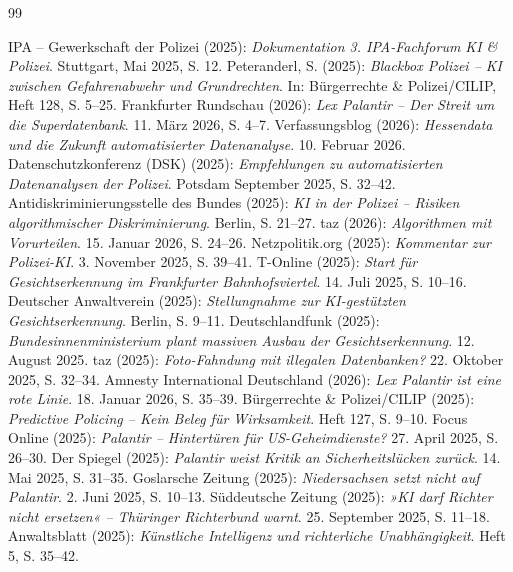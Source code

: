 \documentclass[12pt,a4paper]{article}
\begin{document}
	\newpage
	\begin{thebibliography}{99}
		
		 IPA – Gewerkschaft der Polizei (2025): \emph{Dokumentation 3. IPA-Fachforum KI \& Polizei}. Stuttgart, Mai 2025, S. 12.
		 Peteranderl, S. (2025): \emph{Blackbox Polizei – KI zwischen Gefahrenabwehr und Grundrechten}. In: Bürgerrechte \& Polizei/CILIP, Heft 128, S. 5–25.
		 Frankfurter Rundschau (2026): \emph{Lex Palantir – Der Streit um die Superdatenbank}. 11. März 2026, S. 4–7.
		 Verfassungsblog (2026): \emph{Hessendata und die Zukunft automatisierter Datenanalyse}. 10. Februar 2026.
		 Datenschutzkonferenz (DSK) (2025): \emph{Empfehlungen zu automatisierten Datenanalysen der Polizei}. Potsdam September 2025, S. 32–42.
		 Antidiskriminierungsstelle des Bundes (2025): \emph{KI in der Polizei – Risiken algorithmischer Diskriminierung}. Berlin, S. 21–27.
		 taz (2026): \emph{Algorithmen mit Vorurteilen}. 15. Januar 2026, S. 24–26.
		 Netzpolitik.org (2025): \emph{Kommentar zur Polizei-KI}. 3. November 2025, S. 39–41.
		 T-Online (2025): \emph{Start für Gesichtserkennung im Frankfurter Bahnhofsviertel}. 14. Juli 2025, S. 10–16.
		 Deutscher Anwaltverein (2025): \emph{Stellungnahme zur KI-gestützten Gesichtserkennung}. Berlin, S. 9–11.
		 Deutschlandfunk (2025): \emph{Bundesinnenministerium plant massiven Ausbau der Gesichtserkennung}. 12. August 2025.
		 taz (2025): \emph{Foto-Fahndung mit illegalen Datenbanken?} 22. Oktober 2025, S. 32–34.
		 Amnesty International Deutschland (2026): \emph{Lex Palantir ist eine rote Linie}. 18. Januar 2026, S. 35–39.
		 Bürgerrechte \& Polizei/CILIP (2025): \emph{Predictive Policing – Kein Beleg für Wirksamkeit}. Heft 127, S. 9–10.
		 Focus Online (2025): \emph{Palantir – Hintertüren für US-Geheimdienste?} 27. April 2025, S. 26–30.
		 Der Spiegel (2025): \emph{Palantir weist Kritik an Sicherheitslücken zurück}. 14. Mai 2025, S. 31–35.
		 Goslarsche Zeitung (2025): \emph{Niedersachsen setzt nicht auf Palantir}. 2. Juni 2025, S. 10–13.
		 Süddeutsche Zeitung (2025): \emph{»KI darf Richter nicht ersetzen« – Thüringer Richterbund warnt}. 25. September 2025, S. 11–18.
		 Anwaltsblatt (2025): \emph{Künstliche Intelligenz und richterliche Unabhängigkeit}. Heft 5, S. 35–42.

\end{thebibliography}
\end{document}
